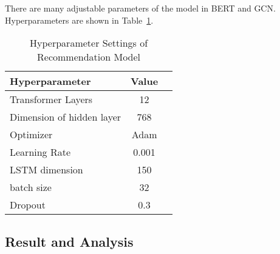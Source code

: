 There are many adjustable parameters of the model in BERT and GCN. Hyperparameters are shown in Table~\ref{table:ch2-hpsetting}.
\begin{table}[H]
	\caption{Hyperparameter Settings of Recommendation Model}\label{table:ch2-hpsetting}
	\centering
	\begin{tabular}{l c c}
		\toprule
		Hyperparameter            & Value \\
		\midrule
		Transformer Layers        & 12    \\
		Dimension of hidden layer & 768   \\
		Optimizer                 & Adam  \\
		Learning Rate             & 0.001 \\
		LSTM dimension            & 150   \\
		batch size                & 32    \\
		Dropout                   & 0.3   \\
		\midrule
		\bottomrule
	\end{tabular}
\end{table}






\subsection{Result and Analysis}

